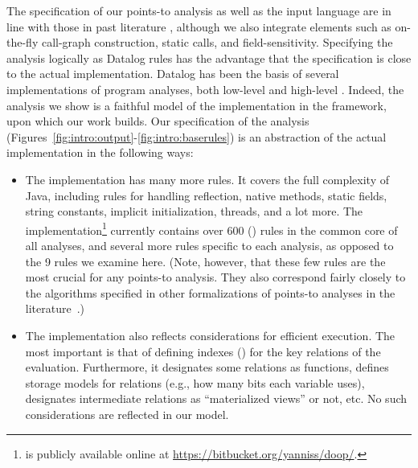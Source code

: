 The specification of our points-to analysis as well as the input language are in line with those in past literature \cite{uss:2009:Guarnieri,fse:2013:Madsen}, although we also integrate elements such as on-the-fly call-graph construction, static calls, and field-sensitivity. Specifying the analysis logically as Datalog rules has the advantage that the specification is close to the actual implementation. Datalog has been the basis of several implementations of program analyses, both low-level \cite{col:1994:Reps,aplas:2005:Whaley,pods:2005:Lam,pldi:2004:Whaley,oopsla:2009:Bravenboer} and high-level \cite{icse:2008:Eichberg,ecoop:2006:Hajiyev}. Indeed, the analysis we show is a faithful model of the implementation in the \doop{} framework, upon which our work builds. Our specification of the analysis (Figures~\ref{fig:intro:output}-\ref{fig:intro:baserules}) is an abstraction of the actual implementation in the following ways:

\begin{itemize}
\item The implementation has many more rules. It covers the full complexity of Java, including rules for handling reflection, native methods, static fields, string constants, implicit initialization, threads, and a lot more. The \doop{} implementation\footnote{\doop{} is publicly available online at \url{https://bitbucket.org/yanniss/doop/}.} currently contains over 600 (\todo{}) rules in the common core of all analyses, and several more rules specific to each analysis, as opposed to the 9 rules we examine here. (Note, however, that these few rules are the most crucial for any points-to analysis. They also correspond fairly closely to the algorithms specified in other formalizations of points-to analyses in the literature~\cite{pldi:2010:Might,popl:2011:Smaragdakis}.)

\item The implementation also reflects considerations for efficient execution. The most important is that of defining indexes (\todo{}) for the key relations of the evaluation. Furthermore, it designates some relations as functions, defines storage models for relations (e.g., how many bits each variable uses), designates intermediate relations as ``materialized views'' or not, etc. No such considerations are reflected in our model.
\end{itemize}

